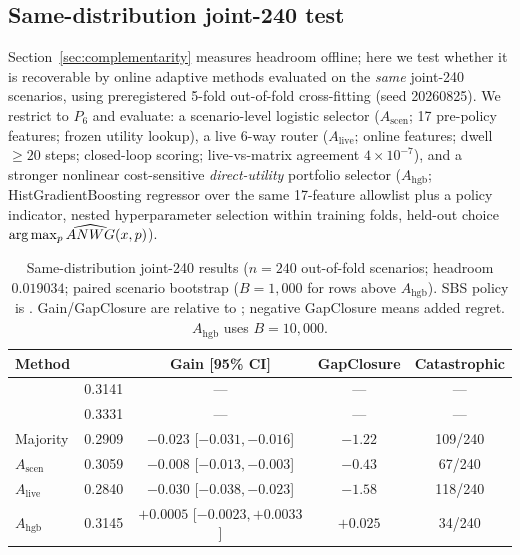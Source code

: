 \documentclass[runningheads]{llncs}
\begin{document}
\subsection{Same-distribution joint-240 test}
\label{sec:same-dist}

Section~\ref{sec:complementarity} measures \vbs{} headroom offline; here we
test whether it is recoverable by online adaptive methods evaluated on the
\emph{same} joint-240 scenarios, using preregistered 5-fold out-of-fold
cross-fitting (seed 20260825). We restrict to $P_6$ and evaluate: a
scenario-level logistic selector ($A_{\text{scen}}$; 17 pre-policy features;
frozen utility lookup), a live 6-way router ($A_{\text{live}}$; online
features; dwell $\geq20$ steps; closed-loop scoring; live-vs-matrix agreement
$4\times10^{-7}$), and a stronger nonlinear cost-sensitive \emph{direct-utility}
portfolio selector ($A_{\mathrm{hgb}}$; HistGradientBoosting regressor over the
same 17-feature allowlist plus a policy indicator, nested hyperparameter
selection within training folds, held-out choice $\arg\max_p \widehat{ANWG{}}(x,p)$).

\begin{table}
\centering
\scriptsize
\caption{Same-distribution joint-240 results ($n=240$ out-of-fold scenarios;
headroom $0.019034$; paired scenario bootstrap ($B=1{,}000$ for rows above
$A_{\mathrm{hgb}}$). SBS policy is .
Gain/GapClosure are relative to \sbs{}; negative GapClosure means added regret.
$A_{\mathrm{hgb}}$ uses $B=10{,}000$.}
\label{tab:samedist}
\setlength{\tabcolsep}{3pt}
\renewcommand{\arraystretch}{0.9}
\begin{tabular}{@{}lcccc@{}}
\toprule
Method & \anwg{} & Gain [95\% CI] & GapClosure & Catastrophic \\
\midrule
\sbs{} & 0.3141 & --- & --- & --- \\
\vbs{} & 0.3331 & --- & --- & --- \\
Majority & 0.2909 & $-0.023$ [$-0.031,-0.016$] & $-1.22$ & 109/240 \\
$A_{\text{scen}}$ & 0.3059 & $-0.008$ [$-0.013,-0.003$] & $-0.43$ & 67/240 \\
$A_{\text{live}}$ & 0.2840 & $-0.030$ [$-0.038,-0.023$] & $-1.58$ & 118/240 \\
$A_{\mathrm{hgb}}$ & 0.3145 & $+0.0005$ [$-0.0023,+0.0033$] & $+0.025$ & 34/240 \\
\bottomrule
\end{tabular}
\renewcommand{\arraystretch}{1}
\end{table}
\end{document}
